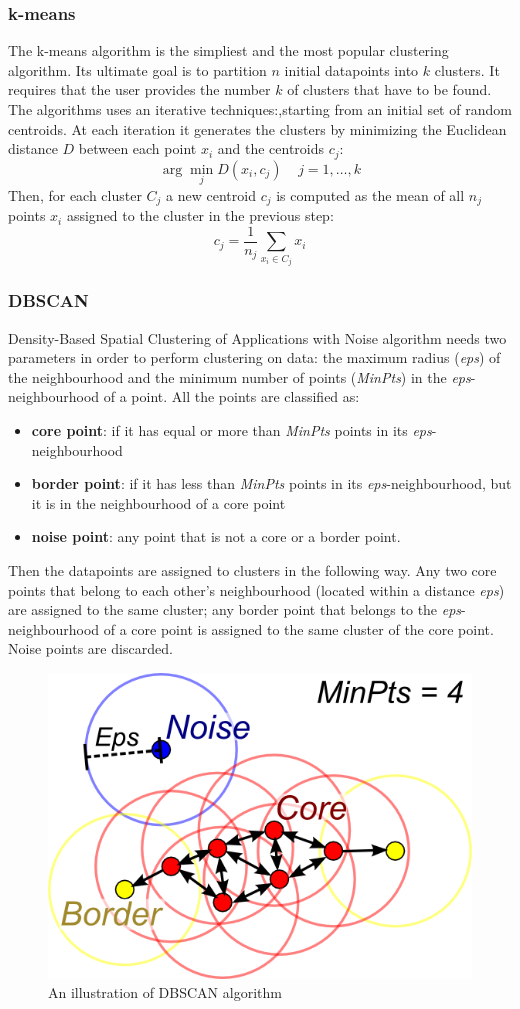 \documentclass[11pt]{article}
\begin{document}
\subsubsection{k-means}
The k-means algorithm is the simpliest and the most popular clustering algorithm. Its ultimate goal is to partition $n$ initial datapoints into $k$ clusters. It requires that the user provides the number $k$ of clusters that have to be found. The algorithms uses an iterative techniques:,starting from an initial set of random centroids. At each iteration it generates the clusters by minimizing the Euclidean distance $D$ between each point $x_i$  and  the centroids $c_j$:  
$$\arg \min\limits_{j}D(x_i, c_j)\;\;\;\; j = 1, \dots, k$$
Then, for each cluster $C_j$ a new centroid $c_j$ is computed as the mean of all $n_j$ points $x_i$ assigned to the cluster in the previous step: 
$$c_j = \frac{1}{n_j} \sum_{x_i \in C_j} x_i$$

\subsubsection{DBSCAN}
Density-Based Spatial Clustering of Applications with Noise algorithm needs two parameters in order to perform clustering on data: the maximum radius (\textit{eps}) of the neighbourhood and the minimum number of points (\textit{MinPts}) in the \textit{eps}-neighbourhood of a point. All the points are classified as: 
\begin{itemize}
	\item \textbf{core point}: if it has equal or more than \textit{MinPts} points in its  \textit{eps}-neighbourhood 
	\item \textbf{border point}: if it has less than \textit{MinPts} points in its  \textit{eps}-neighbourhood, but it is in the neighbourhood of a core point
	\item \textbf{noise point}: any point that is not a core or a border point.
\end{itemize} 
Then the datapoints are assigned to clusters in the following way. Any two core points that belong to each other's neighbourhood (located within a distance \textit{eps}) are assigned to the same cluster; any border point that belongs to the \textit{eps}-neighbourhood of a core point is assigned to the same cluster of the core point. Noise points are discarded. 

\begin{figure}[h]
	\centering
	\includegraphics[width=0.4\linewidth]{./img/dbscan}
	\caption{An illustration of DBSCAN algorithm}
	\label{fig:dbscan}
\end{figure}
\end{document}
